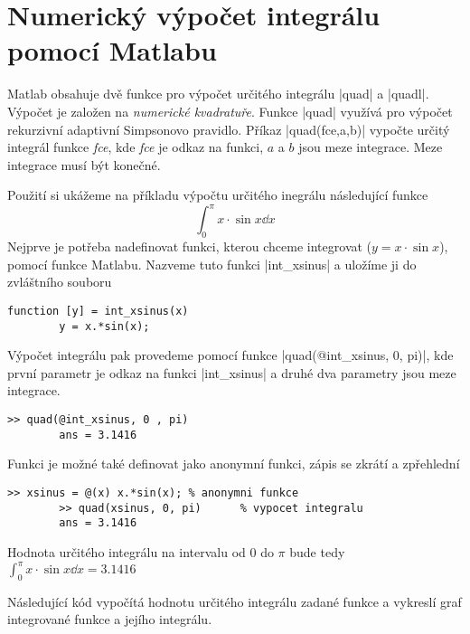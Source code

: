    

\section{Numerický výpočet integrálu pomocí Matlabu}
  Matlab obsahuje dvě funkce pro výpočet určitého integrálu |quad| a |quadl|. Výpočet je založen na
  \emph{numerické kvadratuře}. Funkce |quad| využívá pro výpočet rekurzivní adaptivní Simpsonovo
  pravidlo. Příkaz |quad(fce,a,b)| vypočte určitý integrál funkce \emph{fce}, kde \emph{fce} je
  odkaz na funkci, \(a\) a \(b\) jsou meze integrace. Meze integrace musí být konečné. 

  Použití si ukážeme na příkladu výpočtu určitého inegrálu následující funkce
  \begin{equation*}
    \int_0^\pi x\cdot\sin{x}\dd{x}
  \end{equation*}
  Nejprve je potřeba nadefinovat funkci, kterou chceme integrovat (\(y=x\cdot\sin{x}\)), pomocí
  funkce Matlabu. Nazveme tuto funkci |int\_xsinus| a uložíme ji do zvláštního souboru 
  \begin{lstlisting}[style=luaMatlabStyle] 
        function [y] = int_xsinus(x)
        y = x.*sin(x);
  \end{lstlisting} 
  Výpočet integrálu pak provedeme pomocí funkce |quad(@int\_xsinus, 0, pi)|, kde první parametr je
  odkaz na funkci |int\_xsinus| a druhé dva parametry jsou meze integrace.
  \begin{lstlisting}[style=luaMatlabStyle] 
        >> quad(@int_xsinus, 0 , pi)
        ans = 3.1416
  \end{lstlisting}  
  Funkci je možné také definovat jako anonymní funkci, zápis se zkrátí a zpřehlední
  \begin{lstlisting}[style=luaMatlabStyle]  
        >> xsinus = @(x) x.*sin(x); % anonymni funkce
        >> quad(xsinus, 0, pi)      % vypocet integralu
        ans = 3.1416
  \end{lstlisting}
  Hodnota určitého integrálu na intervalu od \(0\) do \(\pi\) bude tedy \(\int_0^\pi
  x\cdot\sin{x}\dd{x} =\num{3.1416}\)

  Následující kód vypočítá hodnotu určitého integrálu zadané funkce a vykreslí graf integrované
  funkce a jejího integrálu.

  

